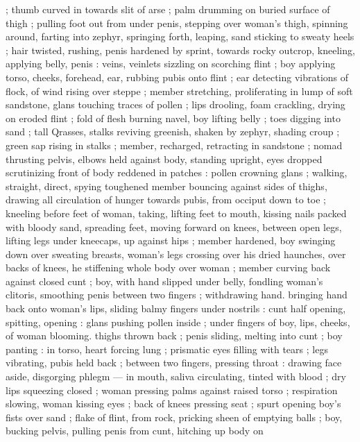 {; thumb curved in towards slit of arse ; palm drumming on buried 
surface of thigh ; pulling foot out from under penis, stepping over 
woman's thigh, spinning around, farting into zephyr, springing forth, 
leaping, sand sticking to sweaty heels ; hair twisted, rushing, penis 
hardened by sprint, towards rocky outcrop, kneeling, applying belly, 
penis : veins, veinlets sizzling on scorching flint ; boy applying torso, 
cheeks, forehead, ear, rubbing pubis onto flint ; ear detecting 
vibrations of flock, of wind rising over steppe ; member stretching, 
proliferating in lump of soft sandstone, glans touching traces of 
pollen ; lips drooling, foam crackling, drying on eroded flint ; fold of 
flesh burning navel, boy lifting belly ; toes digging into sand ; tall 
Qrasses, stalks reviving greenish, shaken by zephyr, shading croup ; 
green sap rising in stalks ; member, recharged, retracting in 
sandstone ; nomad thrusting pelvis, elbows held against body, 
standing upright, eyes dropped scrutinizing front of body reddened 
in patches : pollen crowning glans ; walking, straight, direct, spying 
toughened member bouncing against sides of thighs, drawing all 
circulation of hunger towards pubis, from occiput down to toe ; 
kneeling before feet of woman, taking, lifting feet to mouth, kissing 
nails packed with bloody sand, spreading feet, moving forward on 
knees, between open legs, lifting legs under kneecaps, up against 
hips ; member hardened, boy swinging down over sweating breasts, 
woman's legs crossing over his dried haunches, over backs of knees, 
he stiffening whole body over woman ; member curving back against 
closed cunt ; boy, with hand slipped under belly, fondling woman's 
clitoris, smoothing penis between two fingers ; withdrawing hand. 
bringing hand back onto woman's lips, sliding balmy fingers under 
nostrils : cunt half opening, spitting, opening : glans pushing pollen 
inside ; under fingers of boy, lips, cheeks, of woman blooming. 
thighs thrown back ; penis sliding, melting into cunt ; boy panting : 
in torso, heart forcing lung ; prismatic eyes filling with tears ; legs 
vibrating, pubis held back ; between two fingers, pressing throat : 
drawing face aside, disgorging phlegm --- in mouth, saliva 
circulating, tinted with blood ; dry lips squeezing closed ; woman 
pressing palms against raised torso ; respiration slowing, woman 
kissing eyes ; back of knees pressing seat ; spurt opening boy's fists 
over sand ; flake of flint, from rock, pricking sheen of emptying balls 
; boy, bucking pelvis, pulling penis from cunt, hitching up body on 
}
